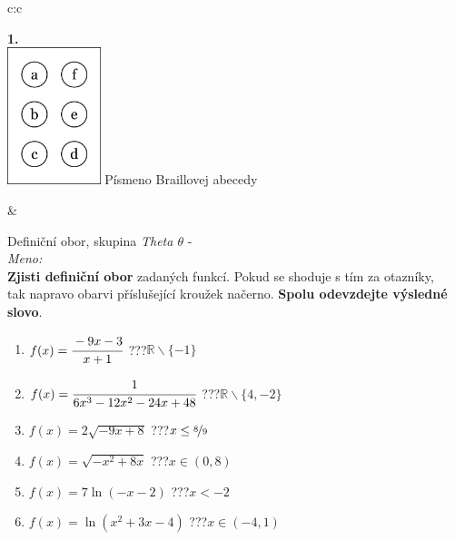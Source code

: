 \documentclass[10pt]{report}
\begin{document}
\begin{tabular}{c:c}
\begin{minipage}[c][99mm][t]{0.49\linewidth}
\begin{center}
\begin{minipage}{0.20\linewidth}
\begin{center}
{\Huge\bfseries 1.} \\[2mm]
\includegraphics[height=40mm]{../images/braille.png}
{\small Písmeno Braillovej abecedy}
\end{center}
\end{minipage}
\end{center}
\end{minipage}
&
\begin{minipage}[c][99mm][t]{0.49\linewidth}
\begin{center}
\vspace{7mm}
{\huge Definiční obor, skupina \textit{Theta $\theta$} -}\\[4.5mm]
\textit{Meno:}\phantom{xxxxxxxxxxxxxxxxxxxxxxxxxxxxxxxxxxxxxxxxxxxxxxxxxxxxxxxxxxxxxxxxx}\\[3.5mm]
\textbf{Zjisti definiční obor} zadaných funkcí. Pokud se shoduje s tím za otazníky,\\tak napravo obarvi příslušející kroužek načerno. \textbf{Spolu odevzdejte výsledné slovo}.\\[3mm]
\begin{minipage}{0.77\linewidth}
\begin{center}
\begin{varwidth}{\textwidth}
\begin{enumerate}
\normalsize
\item $f(x)=\cfrac{-9x-3}{x+1}$\quad \dotfill\; ???\;\dotfill \quad $\mathbb{R}\smallsetminus\{-1\}$
\item $f(x)=\cfrac{1}{6x^3-12x^2-24x+48}$\quad \dotfill\; ???\;\dotfill \quad $\mathbb{R}\smallsetminus\{4,-2\}$
\item $f(x)=2\sqrt{-9x+8}$\quad \dotfill\; ???\;\dotfill \quad $x\leq\nicefrac{8}{9}$
\item $f(x)=\sqrt{-x^2+8x}$\quad \dotfill\; ???\;\dotfill \quad $x\in(0 , 8)$
\item $f(x)=7\ln{(-x-2)}$\quad \dotfill\; ???\;\dotfill \quad $x<-2$
\item $f(x)=\ln{(x^2+3x-4)}$\quad \dotfill\; ???\;\dotfill \quad $x\in(-4 , 1)$

\end{enumerate}
\end{varwidth}
\end{center}
\end{minipage}
\end{center}
\end{minipage}
\end{tabular}
\end{document}
